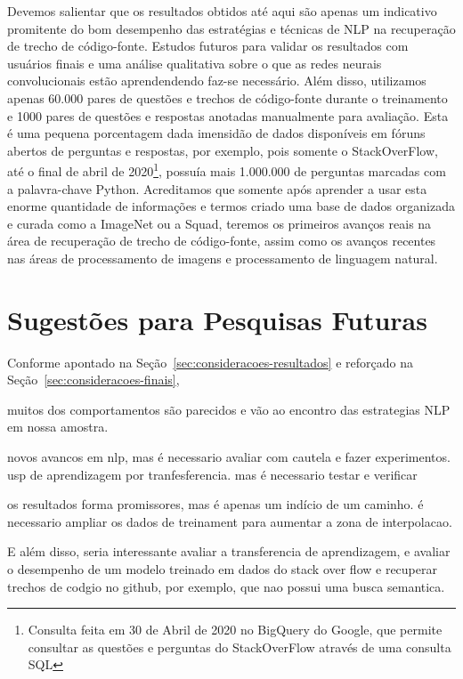 Devemos salientar que os resultados obtidos até aqui são apenas um indicativo promitente do bom desempenho das estratégias e técnicas de NLP na recuperação de trecho de código-fonte. Estudos futuros para validar os resultados com usuários finais e uma análise qualitativa sobre o que as redes neurais convolucionais estão aprendendendo faz-se necessário. Além disso, utilizamos apenas 60.000 pares de questões e trechos de código-fonte durante o treinamento e 1000 pares de questões e respostas anotadas manualmente para avaliação. Esta é uma pequena porcentagem dada imensidão de dados disponíveis em fóruns abertos de perguntas e respostas, por exemplo, pois somente o StackOverFlow, até o final de abril de 2020\footnote{Consulta feita em 30 de Abril de 2020 no BigQuery do Google, que permite consultar as questões e perguntas do StackOverFlow através de uma consulta SQL}, possuía mais 1.000.000 de perguntas marcadas com a palavra-chave Python. Acreditamos que somente após aprender a usar esta enorme quantidade de informações e termos criado uma base de dados organizada e curada como a ImageNet ou a Squad, teremos os primeiros avanços reais na área de recuperação de trecho de código-fonte, assim como os avanços recentes nas áreas de processamento de imagens e processamento de linguagem natural.



\section{Sugestões para Pesquisas Futuras} 

Conforme apontado na Seção~\ref{sec:consideracoes-resultados} e reforçado na Seção~\ref{sec:consideracoes-finais}, 

muitos dos comportamentos são parecidos e vão ao encontro das estrategias NLP em nossa amostra.

novos avancos em nlp, mas é necessario avaliar com cautela e fazer experimentos. usp de aprendizagem por tranfesferencia. mas é necessario testar e verificar

os resultados forma promissores, mas é apenas um indício de um caminho. é necessario ampliar os dados de treinament para aumentar a zona de interpolacao. 

E além disso, seria interessante avaliar a transferencia de aprendizagem, e avaliar o desempenho de um modelo treinado em dados do stack over flow e recuperar trechos de codgio no github, por exemplo, que nao possui uma busca semantica.



